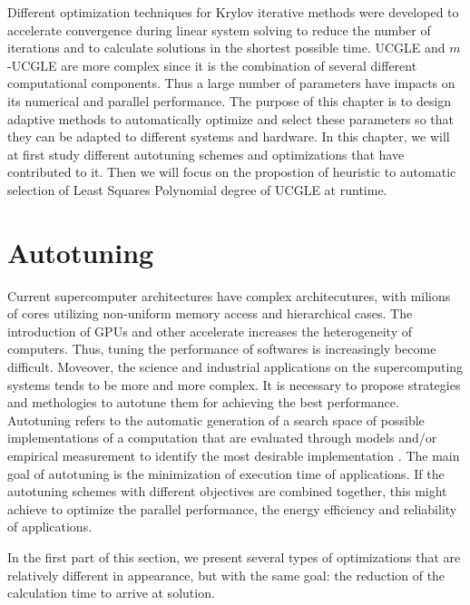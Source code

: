 \begin{displayquote}
	\textsf{Different optimization techniques for Krylov iterative methods were developed to accelerate convergence during linear system solving to reduce the number of iterations and to calculate solutions in the shortest possible time. UCGLE and $m$-UCGLE are more complex since it is the combination of several different computational components. Thus a large number of parameters have impacts on its numerical and parallel performance. The purpose of this chapter is to design adaptive methods to automatically optimize and select these parameters so that they can be adapted to different systems and hardware. In this chapter, we will at first study different autotuning schemes and optimizations that have contributed to it. Then we will focus on the propostion of heuristic to automatic selection of Least Squares Polynomial degree of UCGLE at runtime.}
\end{displayquote}

\vspace{0.6in}

\section{Autotuning}

Current supercomputer architectures have complex architecutures, with milions of cores utilizing non-uniform memory access and hierarchical cases. The introduction of GPUs and other accelerate increases the heterogeneity of computers. Thus, tuning the performance of softwares is increasingly become difficult. Moveover, the science and industrial applications on the supercomputing systems tends to be more and more complex. It is necessary to propose strategies and methologies to autotune them for achieving the best performance. Autotuning refers to the automatic generation of a search space of possible implementations of a computation that are evaluated through models and/or empirical measurement to identify the most desirable implementation \cite{balaprakash2018autotuning}. The main goal of autotuning is the minimization of execution time of applications. If the autotuning schemes with different objectives are combined together, this might achieve to optimize the parallel performance, the energy efficiency and reliability of applications.

In the first part of this section, we present several types of optimizations that are relatively different in appearance, but with the same goal: the reduction of the calculation time to arrive at solution.


